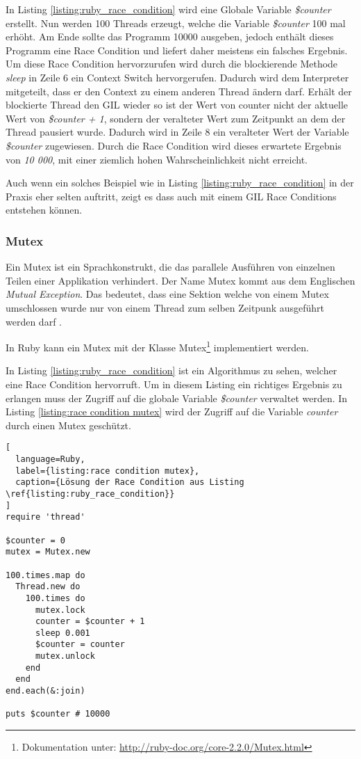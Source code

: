 In Listing \ref{listing:ruby_race_condition} wird eine Globale Variable \emph{\$counter} erstellt. Nun werden 100 Threads erzeugt, welche die Variable \emph{\$counter} 100 mal erhöht. Am Ende sollte das Programm 10000 ausgeben, jedoch enthält dieses Programm eine Race Condition und liefert daher meistens ein falsches Ergebnis. Um diese Race Condition hervorzurufen wird durch die blockierende Methode \emph{sleep} in Zeile 6 ein Context Switch hervorgerufen. Dadurch wird dem Interpreter mitgeteilt, dass er den Context zu einem anderen Thread ändern darf. Erhält der blockierte Thread den GIL wieder so ist der Wert von counter nicht der aktuelle Wert von  \emph{\$counter + 1}, sondern der veralteter Wert zum Zeitpunkt an dem der Thread pausiert wurde. Dadurch wird in Zeile 8 ein veralteter Wert der Variable \emph{\$counter} zugewiesen. Durch die Race Condition wird dieses erwartete Ergebnis von \emph{10 000}, mit einer ziemlich hohen Wahrscheinlichkeit nicht erreicht.

Auch wenn ein solches Beispiel wie in Listing \ref{listing:ruby_race_condition} in der Praxis eher selten auftritt, zeigt es dass auch mit einem GIL Race Conditions entstehen können.

\subsubsection{Mutex}
Ein Mutex ist ein Sprachkonstrukt, die das parallele Ausführen von einzelnen Teilen einer Applikation verhindert. Der Name Mutex kommt aus dem Englischen \emph{Mutual Exception}. Das bedeutet, dass eine Sektion welche von einem Mutex umschlossen wurde nur von einem Thread zum selben Zeitpunk ausgeführt werden darf \cite[p. 81]{Sto2013}. 

In Ruby kann ein Mutex mit der Klasse Mutex\footnote{Dokumentation unter:  \url{http://ruby-doc.org/core-2.2.0/Mutex.html}} implementiert werden.

In Listing \ref{listing:ruby_race_condition} ist ein Algorithmus zu sehen, welcher eine Race Condition hervorruft. Um in diesem Listing ein richtiges Ergebnis zu erlangen muss der Zugriff auf die globale Variable \emph{\$counter} verwaltet werden. In Listing \ref{listing:race condition mutex} wird der Zugriff auf die Variable \emph{counter} durch einen Mutex geschützt. 

\begin{lstlisting}[
  language=Ruby,
  label={listing:race condition mutex},
  caption={Lösung der Race Condition aus Listing \ref{listing:ruby_race_condition}}
]
require 'thread'

$counter = 0
mutex = Mutex.new

100.times.map do
  Thread.new do
    100.times do
      mutex.lock
      counter = $counter + 1
      sleep 0.001
      $counter = counter
      mutex.unlock
    end
  end
end.each(&:join)

puts $counter # 10000
\end{lstlisting}

